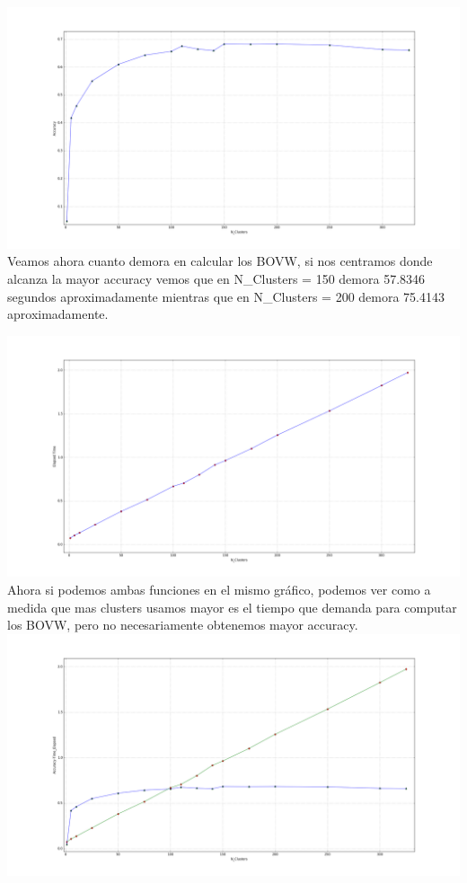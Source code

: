 \documentclass[11pt, spanish, a4paper]{article}
\begin{document}
\includegraphics[scale=0.5, width=\textwidth]{figure_3.png}\\

Veamos ahora cuanto demora en calcular los BOVW, si nos centramos donde alcanza la mayor accuracy vemos que en N\_Clusters = 150 demora 57.8346 segundos aproximadamente mientras que en N\_Clusters = 200 demora 75.4143 aproximadamente.

\includegraphics[scale=0.5, width=\textwidth]{figure_4.png}\\

Ahora si podemos ambas funciones en el mismo gráfico, podemos ver como a medida que mas clusters usamos mayor es el tiempo que demanda para computar los BOVW, pero no necesariamente obtenemos mayor accuracy. \\

\includegraphics[scale=0.5, width=\textwidth]{figure_5.png}\\
\end{document}
